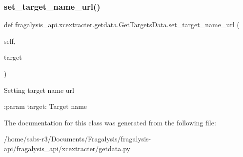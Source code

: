 \subsubsection{\texorpdfstring{set\+\_\+target\+\_\+name\+\_\+url()}{set\_target\_name\_url()}}
{\footnotesize\ttfamily def fragalysis\+\_\+api.\+xcextracter.\+getdata.\+Get\+Targets\+Data.\+set\+\_\+target\+\_\+name\+\_\+url (\begin{DoxyParamCaption}\item[{}]{self,  }\item[{}]{target }\end{DoxyParamCaption})}

\begin{DoxyVerb}Setting target name url

:param target: Target name
\end{DoxyVerb}
 

The documentation for this class was generated from the following file\+:\begin{DoxyCompactItemize}
\item 
/home/sabs-\/r3/\+Documents/\+Fragalysis/fragalysis-\/api/fragalysis\+\_\+api/xcextracter/getdata.\+py\end{DoxyCompactItemize}
